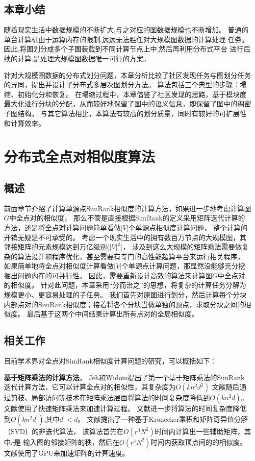 \documentclass[master]{njuthesis}
\begin{document}
\section{本章小结}
随着现实生活中数据规模的不断扩大,与之对应的图数据规模也不断增加。
普通的单台计算机由于运算内存的限制,远远无法胜任对大规模图数据的计算处理
任务。因此,将图划分成多个子图装载到不同计算节点上中,然后再利用分布式平台
进行后续的计算,是处理大规模图数据唯一可行的方案。

针对大规模图数据的分布式划分问题，本章分析比较了社区发现任务与图划分任务的异同，提出并设计了分布式多层次图划分方法。
算法包括三个典型的步骤：塌缩、初始化分和恢复。
在塌缩过程中，本章借鉴了社区发现的思路，基于模块度最大化进行分块的分配，从而较好地保留了图中的语义信息，即保留了图中的稠密子图结构。
与其它算法相比，本算法有较高的划分质量，同时有较好的可扩展性和计算效率。

\chapter{分布式全点对相似度算法}\label{chapter_allSimRank}
\section{概述}
前面章节介绍了计算单源点SimRank相似度的计算方法，如果进一步地考虑计算图$G$中全点对的相似度，
那么不管是直接根据SimRank的定义采用矩阵迭代计算的方法，还是将全点对计算问题简单看做$|V|$个单源点相似度计算问题，
整个计算的开销无疑是不可承受的。
考虑一个现实生活中的拥有数百万节点的大规模图，其邻接矩阵的元素规模达到万亿级别($|V|^2$)，
涉及到这么大规模的矩阵乘法需要做复杂的算法设计和程序优化，甚至需要有专门的高性能超算平台来运行相关程序。
如果简单地将全点对相似度计算看做$|V|$个单源点计算问题，那显然没能够充分挖掘出问题内在的可并行性。
因此，需要重新设计高效的算法来计算图$G$中全点对的相似度。
针对此问题，本章采用“分而治之”的思想，将复杂的计算任务分解为规模更小、更容易处理的子任务。
我们首先对原图进行划分，然后计算每个分块内部点对的SimRank相似度；接着将各个分块当做单独的顶点，求取分块之间的相似度。
最后基于这两个中间结果计算出所有点对的全局相似度。
\section{相关工作}
目前学术界对全点对SimRank相似度计算问题的研究，可以概括如下：

\textbf{基于矩阵乘法的计算方法}。 
Jeh和Widom\cite{jeh2002simrank}提出了第一个基于矩阵乘法的SimRank迭代计算方法，它可以计算全点对的相似性，其复杂度为$O(kn^2d^2)$
文献\cite{lizorkin2008accuracy}随后通过剪枝、局部访问等技术在矩阵乘法层面将算法的时间复杂度降低到$O(kn^2d)$。
文献\cite{yu2012space}使用了快速矩阵乘法来加速计算过程。
文献\cite{yu2013towards}进一步将算法的时间复杂度降低到$O(kn^2d^{\prime})$,其中$d^\prime < d$。
文献\cite{li2010fast1}提出了一种基于Kronecker乘积和矩阵奇异值分解（SVD）的非迭代算法，
该算法首先在$O(r^4N^2)$时间内计算出一些辅助矩阵，其中$r$是
输入图的邻接矩阵的秩，然后在$O(r^4N^2)$时间内获取顶点间的的相似度。
文献\cite{he2010parallel}使用了GPU来加速矩阵的计算速度。
\end{document}
